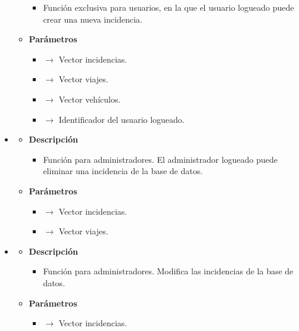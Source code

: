 \begin{itemize}
\begin{itemize}
        \begin{itemize}
			\item Función exclusiva para usuarios, en la que el usuario logueado puede crear una nueva incidencia.
		\end{itemize}
        \item \textbf{Parámetros}
		\begin{itemize}
            \item {} $\rightarrow$ Vector incidencias.
            \item {} $\rightarrow$ Vector viajes.
            \item {} $\rightarrow$ Vector vehículos.
            \item {} $\rightarrow$ Identificador del usuario logueado.
		\end{itemize}
	\end{itemize}
    \item{}
	\begin{itemize}
		\item \textbf{Descripción}
        \begin{itemize}
			\item Función para administradores. El administrador logueado puede eliminar una incidencia de la base de datos.
		\end{itemize}
        \item \textbf{Parámetros}
		\begin{itemize}
			\item {} $\rightarrow$ Vector incidencias.
            \item {} $\rightarrow$ Vector viajes.
		\end{itemize}
	\end{itemize}
    \newpage
    \item{}
	\begin{itemize}
		\item \textbf{Descripción}
        \begin{itemize}
			\item Función para administradores. Modifica las incidencias de la base de datos.
		\end{itemize}
        \item \textbf{Parámetros}
		\begin{itemize}
			\item {} $\rightarrow$ Vector incidencias.
		\end{itemize}
	\end{itemize}
\end{itemize}
\newpage